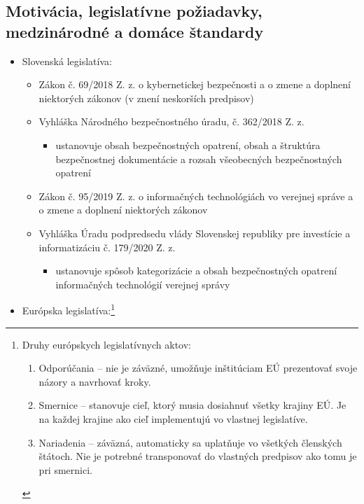 \documentclass[12pt,a4paper]{article}
\begin{document}
{    \subsection{Motivácia, legislatívne požiadavky, medzinárodné a domáce štandardy}
    \begin{itemize}
        \item Slovenská legislatíva:
        \begin{itemize}
            \item Zákon č. 69/2018 Z. z. o kybernetickej bezpečnosti a o zmene a doplnení niektorých zákonov (v znení neskorších predpisov)
            \item Vyhláška Národného bezpečnostného úradu, č. 362/2018 Z. z.
            \begin{itemize}
                \item ustanovuje obsah bezpečnostných opatrení, obsah a štruktúra bezpečnostnej dokumentácie a rozsah všeobecných bezpečnostných opatrení
            \end{itemize}
            \item Zákon č. 95/2019 Z. z. o informačných technológiách vo verejnej správe a o zmene a doplnení niektorých zákonov
            \item Vyhláška Úradu podpredsedu vlády Slovenskej republiky pre investície a informatizáciu č. 179/2020 Z. z.
            \begin{itemize}
                \item ustanovuje spôsob kategorizácie a obsah bezpečnostných opatrení informačných technológií verejnej správy
            \end{itemize}
        \end{itemize}
        \item Európska legislatíva:\footnote{Druhy európskych legislatívnych aktov: \begin{enumerate}
            \item Odporúčania -- nie je záväzné, umožňuje inštitúciam EÚ prezentovať svoje názory a navrhovať kroky.
            \item Smernice -- stanovuje cieľ, ktorý musia dosiahnuť všetky krajiny EÚ. Je na každej krajine ako cieľ implementujú vo vlastnej legislatíve.
            \item Nariadenia -- záväzná, automaticky sa uplatňuje vo všetkých členských štátoch. Nie je potrebné transponovať do vlastných predpisov ako tomu je pri smernici.
        \end{enumerate}}
        \begin{itemize}

\end{itemize}
\end{itemize}}
\end{document}
